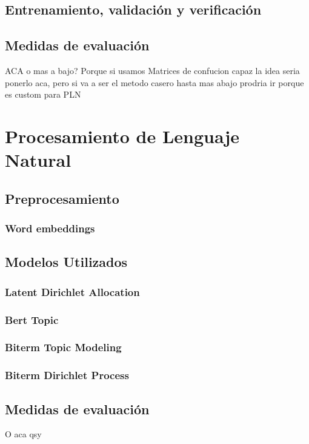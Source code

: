 \subsection{Entrenamiento, validación y verificación}

\subsection{Medidas de evaluación}
ACA o mas a bajo?
Porque si usamos Matrices de confucion capaz la idea seria ponerlo aca, pero si va a ser el metodo casero hasta mas abajo prodria ir porque es custom para PLN

\section{Procesamiento de Lenguaje Natural}\label{sec:CAP2_PLN}

\subsection{Preprocesamiento}

\subsubsection{Word embeddings}

\subsection{Modelos Utilizados}

\subsubsection{Latent Dirichlet Allocation}

\subsubsection{Bert Topic}

\subsubsection{Biterm Topic Modeling}

\subsubsection{Biterm Dirichlet Process}

\subsection{Medidas de evaluación}
O aca qsy

